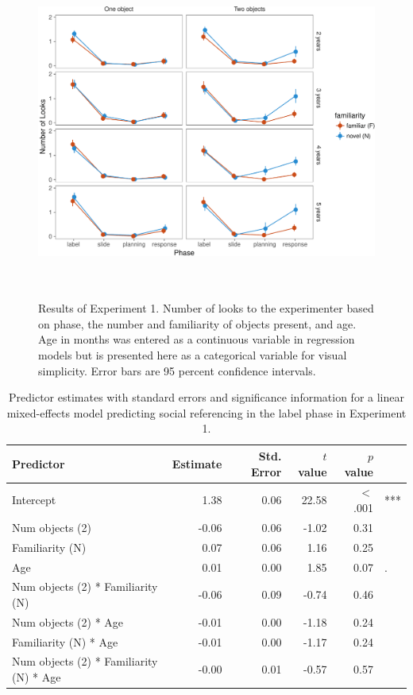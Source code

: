 \documentclass[a4paper,man,apacite,floatsintext]{apa6}
\newenvironment{CodeChunk}{}{}
\begin{document}
\begin{CodeChunk}
\begin{figure}[b]

{\centering \includegraphics[width=5.75in,height=4.35in]{figs/results_e1-1} 

}

\caption[Results of Experiment 1]{Results of Experiment 1. Number of looks to the experimenter based on phase, the number and familiarity of objects present, and age. Age in months was entered as a continuous variable in regression models but is presented here as a categorical variable for visual simplicity. Error bars are 95 percent confidence intervals.}\label{fig:results_e1}
\end{figure}
\end{CodeChunk}

\begin{table}[tb]
\centering
\begin{tabular}{lrrrrl}
 Predictor & Estimate & Std. Error & $t$ value & $p$ value &  \\ 
  \hline
Intercept & 1.38 & 0.06 & 22.58 & $<$ .001 & *** \\ 
  Num objects (2) & -0.06 & 0.06 & -1.02 & 0.31 &  \\ 
  Familiarity (N) & 0.07 & 0.06 & 1.16 & 0.25 &  \\ 
  Age & 0.01 & 0.00 & 1.85 & 0.07 & . \\ 
  Num objects (2) * Familiarity (N) & -0.06 & 0.09 & -0.74 & 0.46 &  \\ 
  Num objects (2) * Age & -0.01 & 0.00 & -1.18 & 0.24 &  \\ 
  Familiarity (N) * Age & -0.01 & 0.00 & -1.17 & 0.24 &  \\ 
  Num objects (2) * Familiarity (N) * Age & -0.00 & 0.01 & -0.57 & 0.57 &  \\ 
   \hline
\end{tabular}
\caption{Predictor estimates with standard errors and significance information for a linear mixed-effects model predicting social referencing in the label phase in Experiment 1.} 
\label{tab:exp1_l_reg}
\end{table}
\end{document}
